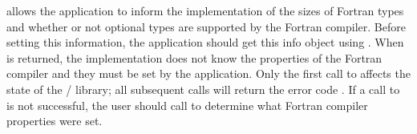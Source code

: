  allows the application
to inform the implementation of the sizes of Fortran types
and whether or not optional types are supported by the
Fortran compiler.
Before setting this information, the application should
get this info object using .
When  is returned, the implementation
does not know the properties of the Fortran compiler and they
must be set by the application.
Only the first call to 
affects the state of the \MPI/ library; all subsequent calls
will return the error code .
If a call to  is not
successful, the user should call 
to determine what Fortran compiler properties were set.

